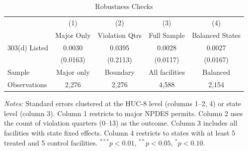 \begin{table}[htbp]
\centering
\caption{Robustness Checks}
\label{tab:robustness}
\begin{tabular}{lcccc}
\hline\hline
 & (1) & (2) & (3) & (4) \\
 & Major Only & Violation Qtrs & Full Sample & Balanced States \\
\hline
303(d) Listed & 0.0030 & 0.0395 & 0.0028 & 0.0027 \\
 & (0.0163) & (0.2113) & (0.0117) & (0.0167) \\
\hline
Sample & Major only & Boundary & All facilities & Balanced \\
Observations & 2,276 & 2,276 & 4,588 & 2,154 \\
\hline\hline
\end{tabular}
\begin{tablenotes}[flushleft]\footnotesize
\item \textit{Notes:} Standard errors clustered at the HUC-8 level (columns 1--2, 4)
or state level (column 3). Column 1 restricts to major NPDES permits.
Column 2 uses the count of violation quarters (0--13) as the outcome.
Column 3 includes all facilities with state fixed effects.
Column 4 restricts to states with at least 5 treated and 5 control facilities.
$^{***}p<0.01$, $^{**}p<0.05$, $^{*}p<0.10$.
\end{tablenotes}
\end{table}
